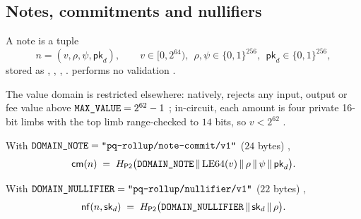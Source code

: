 \subsection{Notes, commitments and nullifiers}
\label{subsec:ss-notes}

\begin{definition}[Note]
A note is a tuple
\[
  n = (v, \rho, \psi, \mathsf{pk}_d), \qquad v \in [0, 2^{64}),\ \ \rho,\psi \in \{0,1\}^{256},\ \ \mathsf{pk}_d \in \{0,1\}^{256},
\]
stored as , \code{[u8;32]}, \code{[u8;32]}, 
.  performs no validation
.
\end{definition}

The value domain is restricted elsewhere: natively, 
rejects any input, output or fee value above
$\texttt{MAX\_VALUE} = 2^{62}-1$ ;
in-circuit, each amount is four private 16-bit limbs with the top limb
range-checked to $14$ bits, so $v < 2^{62}$
.

\begin{definition}
\label{def:ss-cm}
With $\texttt{DOMAIN\_NOTE} = \texttt{"pq-rollup/note-commit/v1"}$ ($24$ bytes)
,
\begin{equation}
  \mathsf{cm}(n) \;=\; H_{\mathsf{P2}}\big(\texttt{DOMAIN\_NOTE}\,\|\,\mathrm{LE64}(v)\,\|\,\rho\,\|\,\psi\,\|\,\mathsf{pk}_d\big).
\end{equation}
\end{definition}

\begin{definition}[Nullifier]
\label{def:ss-nf}
With $\texttt{DOMAIN\_NULLIFIER} = \texttt{"pq-rollup/nullifier/v1"}$ ($22$ bytes)
,
\begin{equation}
  \mathsf{nf}(n, \mathsf{sk}_d) \;=\; H_{\mathsf{P2}}\big(\texttt{DOMAIN\_NULLIFIER}\,\|\,\mathsf{sk}_d\,\|\,\rho\big).
\end{equation}
\end{definition}

